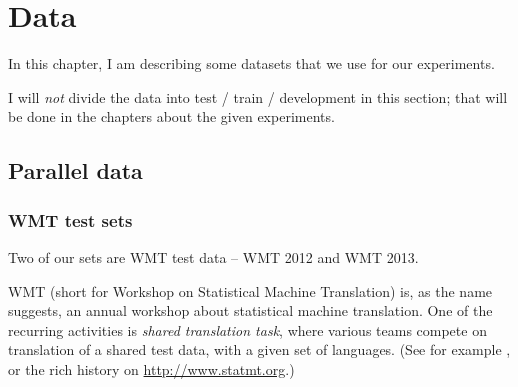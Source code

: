 \chapter{Data}
In this chapter, I am describing some datasets that we use for our experiments.

I will \emph{not} divide the data into test / train / development in this section; that will be done in the chapters about the given experiments.





\section{Parallel data}

\subsection{WMT test sets}
Two of our sets are WMT test data -- WMT 2012 and WMT 2013.

WMT (short for Workshop on Statistical Machine Translation) is, as the name suggests, an annual workshop about statistical machine translation. One of the recurring activities is \emph{shared translation task}, where various teams compete on translation of a shared test data, with a given set of languages. (See for example \cite{wmt_findings_2013}, or the rich history on \url{http://www.statmt.org}.) 


